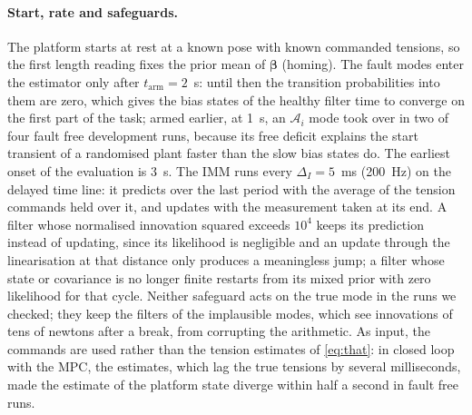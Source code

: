 \documentclass[10pt]{article}
\newcommand{\vc}[1]{\bm{#1}}
\begin{document}
\paragraph{Start, rate and safeguards.} The platform starts at rest at a known pose with known commanded tensions, so the first length reading fixes the prior mean of $\vc\beta$ (homing). The fault modes enter the estimator only after $t_{\mathrm{arm}}=2$~s: until then the transition probabilities into them are zero, which gives the bias states of the healthy filter time to converge on the first part of the task; armed earlier, at 1~s, an $\mathcal A_i$ mode took over in two of four fault free development runs, because its free deficit explains the start transient of a randomised plant faster than the slow bias states do. The earliest onset of the evaluation is 3~s. The IMM runs every $\Delta_I=5$~ms (200~Hz) on the delayed time line: it predicts over the last period with the average of the tension commands held over it, and updates with the measurement taken at its end. A filter whose normalised innovation squared exceeds $10^4$ keeps its prediction instead of updating, since its likelihood is negligible and an update through the linearisation at that distance only produces a meaningless jump; a filter whose state or covariance is no longer finite restarts from its mixed prior with zero likelihood for that cycle. Neither safeguard acts on the true mode in the runs we checked; they keep the filters of the implausible modes, which see innovations of tens of newtons after a break, from corrupting the arithmetic. As input, the commands are used rather than the tension estimates of \eqref{eq:that}: in closed loop with the MPC, the estimates, which lag the true tensions by several milliseconds, made the estimate of the platform state diverge within half a second in fault free runs.
\end{document}
